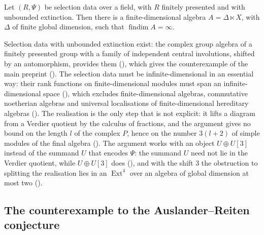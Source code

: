 \begin{theorem*}
  Let $(R,\Psi)$ be selection data over a field, with $R$ finitely presented
  and with unbounded extinction. Then there is a finite-dimensional algebra
  ${A=\Delta\ltimes X}$, with $\Delta$ of finite global dimension, such that
  ${\operatorname{findim}A=\infty}$.
\end{theorem*}

Selection data with unbounded extinction exist: the complex group algebra of a
finitely presented group with a family of independent central involutions,
shifted by an automorphism, provides them (),
which gives the counterexample of the main preprint (). The
selection data must be infinite-dimensional in an essential way: their rank
functions on finite-dimensional modules must span an infinite-dimensional space
(), which excludes finite-dimensional algebras,
commutative noetherian algebras and universal localisations of
finite-dimensional hereditary algebras
(). The realisation is the only step that is not
explicit: it lifts a diagram from a Verdier quotient by the calculus of
fractions, and the argument gives no bound on the length $l$ of the complex $P$,
hence on the number ${3(l+2)}$ of simple modules of the final algebra
(). The argument works with
an object ${U\oplus U[3]}$ instead of the summand $U$ that encodes $\Psi$: the
summand $U$ need not lie in the Verdier quotient, while ${U\oplus U[3]}$ does
(), and with the shift $3$ the obstruction to splitting
the realisation lies in an $\operatorname{Ext}^4$ over an algebra of global
dimension at most two ().

\subsection*{The counterexample to the Auslander--Reiten conjecture}

